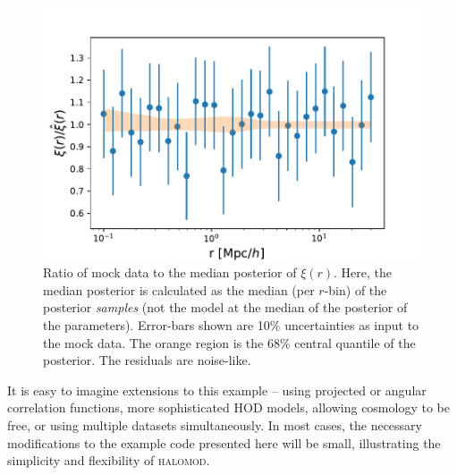 \documentclass[5p,aas_macros]{elsarticle}
\newcommand{\halomod}{\textsc{halomod}\xspace} %
\providecommand{\DIFdelbegin}{} %
\begin{document}
\begin{figure}
    \centering
    \includegraphics[width=\linewidth]{residuals.pdf}
    \caption{Ratio of mock data to the median posterior of $\xi(r)$. Here, the median posterior is calculated as the median (per $r$-bin) of the posterior \textit{samples} (not the model at the median of the posterior of the parameters). Error-bars shown are 10\% uncertainties as input to the mock data. The orange region is the 68\% central quantile of the posterior. The residuals are noise-like.}
    \label{fig:example_resids}
\end{figure}

It is easy to imagine extensions to this example -- using projected or angular correlation functions, more sophisticated HOD models, allowing cosmology to be free, or using multiple datasets simultaneously. 
In most cases, the necessary modifications to the example code presented here will be small, illustrating the simplicity and flexibility of \halomod.



\DIFdelbegin %

\end{document}
